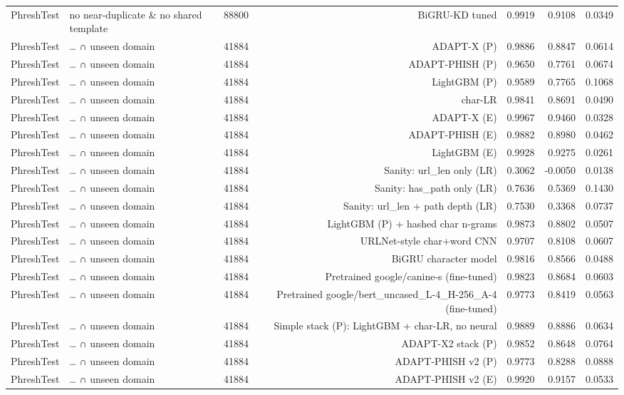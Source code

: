 \begin{table}[t]
\begin{tabular}{llrrrrr}
PhreshTest & no near-duplicate \& no shared template & 88800 & BiGRU-KD tuned & 0.9919 & 0.9108 & 0.0349 \\
PhreshTest & … ∩ unseen domain & 41884 & ADAPT-X (P) & 0.9886 & 0.8847 & 0.0614 \\
PhreshTest & … ∩ unseen domain & 41884 & ADAPT-PHISH (P) & 0.9650 & 0.7761 & 0.0674 \\
PhreshTest & … ∩ unseen domain & 41884 & LightGBM (P) & 0.9589 & 0.7765 & 0.1068 \\
PhreshTest & … ∩ unseen domain & 41884 & char-LR & 0.9841 & 0.8691 & 0.0490 \\
PhreshTest & … ∩ unseen domain & 41884 & ADAPT-X (E) & 0.9967 & 0.9460 & 0.0328 \\
PhreshTest & … ∩ unseen domain & 41884 & ADAPT-PHISH (E) & 0.9882 & 0.8980 & 0.0462 \\
PhreshTest & … ∩ unseen domain & 41884 & LightGBM (E) & 0.9928 & 0.9275 & 0.0261 \\
PhreshTest & … ∩ unseen domain & 41884 & Sanity: url\_len only (LR) & 0.3062 & -0.0050 & 0.0138 \\
PhreshTest & … ∩ unseen domain & 41884 & Sanity: has\_path only (LR) & 0.7636 & 0.5369 & 0.1430 \\
PhreshTest & … ∩ unseen domain & 41884 & Sanity: url\_len + path depth (LR) & 0.7530 & 0.3368 & 0.0737 \\
PhreshTest & … ∩ unseen domain & 41884 & LightGBM (P) + hashed char n-grams & 0.9873 & 0.8802 & 0.0507 \\
PhreshTest & … ∩ unseen domain & 41884 & URLNet-style char+word CNN & 0.9707 & 0.8108 & 0.0607 \\
PhreshTest & … ∩ unseen domain & 41884 & BiGRU character model & 0.9816 & 0.8566 & 0.0488 \\
PhreshTest & … ∩ unseen domain & 41884 & Pretrained google/canine-s (fine-tuned) & 0.9823 & 0.8684 & 0.0603 \\
PhreshTest & … ∩ unseen domain & 41884 & Pretrained google/bert\_uncased\_L-4\_H-256\_A-4 (fine-tuned) & 0.9773 & 0.8419 & 0.0563 \\
PhreshTest & … ∩ unseen domain & 41884 & Simple stack (P): LightGBM + char-LR, no neural & 0.9889 & 0.8886 & 0.0634 \\
PhreshTest & … ∩ unseen domain & 41884 & ADAPT-X2 stack (P) & 0.9852 & 0.8648 & 0.0764 \\
PhreshTest & … ∩ unseen domain & 41884 & ADAPT-PHISH v2 (P) & 0.9773 & 0.8288 & 0.0888 \\
PhreshTest & … ∩ unseen domain & 41884 & ADAPT-PHISH v2 (E) & 0.9920 & 0.9157 & 0.0533 \\

\end{tabular}
\end{table}
